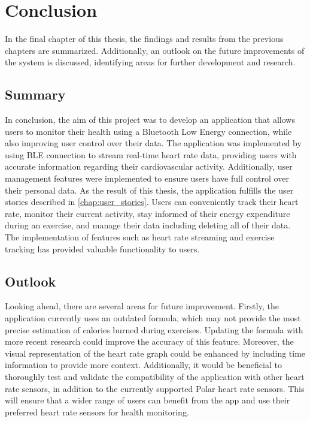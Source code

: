 \chapter{Conclusion}
In the final chapter of this thesis, the findings and results from the previous chapters are summarized. 
Additionally, an outlook on the future improvements of the system is discussed, identifying areas for further development and research. 

\section{Summary}
In conclusion, the aim of this project was to develop an application that allows users to monitor their health using a Bluetooth Low Energy connection, while also improving user control over their data. 
The application was implemented by using BLE connection to stream real-time heart rate data, providing users with accurate information regarding their cardiovascular activity. 
Additionally, user management features were implemented to ensure users have full control over their personal data.
As the result of this thesis, the application fulfills the user stories described in \autoref{chap:user_stories}.
Users can conveniently track their heart rate, monitor their current activity, stay informed of their energy expenditure during an exercise, and manage their data including deleting all of their data. 
The implementation of features such as heart rate streaming and exercise tracking has provided valuable functionality to users.

\section{Outlook}
Looking ahead, there are several areas for future improvement. 
Firstly, the application currently uses an outdated formula, which may not provide the most precise estimation of calories burned during exercises. 
Updating the formula with more recent research could improve the accuracy of this feature.
Moreover, the visual representation of the heart rate graph could be enhanced by including time information to provide more context.
Additionally, it would be beneficial to thoroughly test and validate the compatibility of the application with other heart rate sensors, in addition to the currently supported Polar heart rate sensors. 
This will ensure that a wider range of users can benefit from the app and use their preferred heart rate sensors for health monitoring.